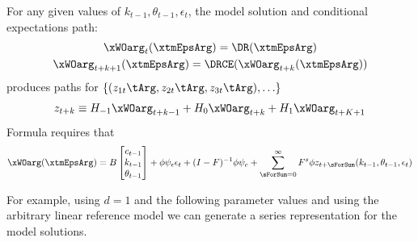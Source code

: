\documentclass[12pt]{article}
\begin{document}
For any given values of $k_{t-1},\theta_{t-1}, \epsilon_t$, the model solution and conditional expectations path:
\begin{gather*}
  \xWOarg_t(\xtmEpsArg)=\DR(\xtmEpsArg)\\
  \xWOarg_{t+k+1}(\xtmEpsArg)=\DRCE(\xWOarg_{t+k}(\xtmEpsArg))
\end{gather*}
produces paths for $\{(z_{1t}\tArg, z_{2t}\tArg, z_{3t}\tArg),\ldots\}$
\begin{gather*}
  z_{t+k} \equiv H_{-1} \xWOarg_{t+k-1} +  H_0 \xWOarg_{t+k} +  H_1 \xWOarg_{t+K+1} 
\end{gather*}
Formula  requires that
\begin{gather*}
\xWOarg(\xtmEpsArg)=
B   \begin{bmatrix}
c_{t-1}\\
k_{t-1}\\
\theta_{t-1}
  \end{bmatrix}  + \phi \psi_\epsilon\epsilon_t + (I - F)^{-1} \phi \psi_c + \sum_{\sForSum=0}^\infty F^s \phi z_{t+\sForSum}(k_{t-1},\theta_{t-1}, \epsilon_t) 
\end{gather*}

For example, using $d=1$ and the following parameter values and using the arbitrary linear reference model we can generate a series representation for the model solutions.
\end{document}
